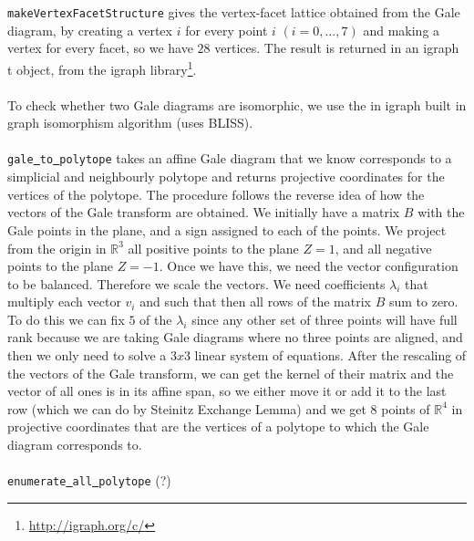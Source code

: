 \documentclass[paper=a4, fontsize=11pt]{scrartcl} %
\newcommand{\RR}{{\mathbb R}}
\theoremstyle{definition}
\begin{document}
\texttt{makeVertexFacetStructure} gives the vertex-facet lattice obtained from the Gale diagram, by creating a vertex $i$ for every point $i$ $(i=0,\ldots,7)$ and making a vertex for every facet, so we have $28$ vertices. The result is returned in an igraph\underline{ }t object, from the igraph library\footnote{\url{http://igraph.org/c/}}. \\
\\
To check whether two Gale diagrams are isomorphic, we use the in igraph built in graph isomorphism algorithm (uses BLISS).\\
\\
\texttt{gale\underline{ }to\underline{ }polytope} takes an affine Gale diagram that we know corresponds to a simplicial and neighbourly polytope and returns projective coordinates for the vertices of the polytope. The procedure follows the reverse idea of how the vectors of the Gale transform are obtained. We initially have a matrix $B$ with the Gale points in the plane, and a sign assigned to each of the points. We project from the origin in $\RR^3$ all positive points to the plane $Z = 1$, and all negative points to the plane $Z = -1$. Once we have this, we need the vector configuration to be balanced. Therefore we scale the vectors. We need coefficients $\lambda_i$ that multiply each vector $v_i$ and such that then all rows of the matrix $B$ sum to zero. To do this we can fix $5$ of the $\lambda_i$ since any other set of three points will have full rank because we are taking Gale diagrams where no three points are aligned, and then we only need to solve a $3x3$ linear system of equations. After the rescaling of the vectors of the Gale transform, we can get the kernel of their matrix and the vector of all ones is in its affine span, so we either move it or add it to the last row (which we can do by Steinitz Exchange Lemma) and we get 8 points of $\RR^4$ in projective coordinates that are the vertices of a polytope to which the Gale diagram corresponds to.\\
\\
\texttt{enumerate\underline{ }all\underline{ }polytope} (?)
\end{document}
